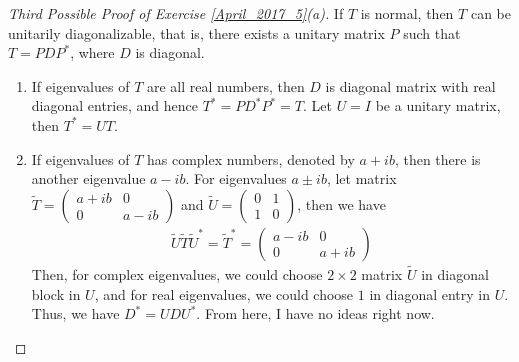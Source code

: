 \documentclass[11pt]{article}
\theoremstyle{definition}
\numberwithin{equation}{subsection}
\begin{document}
\medskip

\begin{proof}[Third Possible Proof of Exercise \ref{April_2017_5}(a)]
If $T$ is normal, then $T$ can be unitarily diagonalizable, that is, there exists a unitary matrix $P$ such that $T = PDP^*$, where $D$ is diagonal. 
\begin{enumerate}[label=\arabic*)]
    \item If eigenvalues of $T$ are all real numbers, then $D$ is diagonal matrix with real diagonal entries, and hence $T^* = PD^*P^* = T$. Let $U = I$ be a unitary matrix, then $T^* = UT$.
    
    \item If eigenvalues of $T$ has complex numbers, denoted by $a + ib$, then there is another eigenvalue $a - ib$. For eigenvalues $a \pm ib$, let matrix $\widetilde{T} = \begin{pmatrix} a+ib & 0 \\ 0 & a-ib \end{pmatrix}$ and $\widetilde{U} = \begin{pmatrix} 0 & 1 \\ 1 & 0 \end{pmatrix}$, then we have 
    \begin{align*}
        \widetilde{U} \widetilde{T} \widetilde{U}^* = \widetilde{T}^* = \begin{pmatrix} a-ib & 0 \\ 0 & a+ib \end{pmatrix}
    \end{align*}
    Then, for complex eigenvalues, we could choose $2 \times 2$ matrix $\widetilde{U}$ in diagonal block in $U$, and for real eigenvalues, we could choose $1$ in diagonal entry in $U$. Thus, we have $D^* = U D U^*$. From here, I have no ideas right now.
\end{enumerate}
\end{proof}

\medskip
\end{document}
